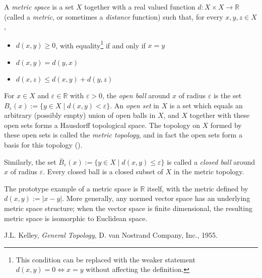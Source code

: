\documentclass{article}
\begin{document}
A \emph{metric space} is a set $X$ together with a real valued function $d: X \times X \longrightarrow \mathbb{R}$ (called a \emph{metric}, or sometimes a \emph{distance} function) such that, for every $x,y,z \in X$,
\begin{itemize}
\item $d(x,y) \geq 0$, with equality\footnote{This condition can be replaced with the weaker statement $d(x,y) = 0 \iff x=y$ without affecting the definition.} if and only if $x=y$
\item $d(x,y) = d(y,x)$
\item $d(x,z) \leq d(x,y) + d(y,z)$
\end{itemize}
For $x \in X$ and $\varepsilon \in \mathbb{R}$ with $\varepsilon > 0$, the \emph{open ball} around $x$ of radius $\varepsilon$ is the set $B_\varepsilon(x) := \{y \in X \mid d(x,y) < \varepsilon\}$. An \emph{open set} in $X$ is a set which equals an arbitrary (possibly empty) union of open balls in $X$, and $X$ together with these open sets forms a Hausdorff topological space. The topology on $X$ formed by these open sets is called the \emph{metric topology}, and in fact the open sets form a basis for this topology ().

Similarly, the set $\bar{B}_\varepsilon(x) := \{y \in X \mid d(x,y) \leq \varepsilon\}$ is called a \emph{closed ball} around $x$ of radius $\varepsilon$. Every closed ball is a closed subset of $X$ in the metric topology.

The prototype example of a metric space is $\mathbb{R}$ itself, with the metric defined by $d(x,y) := |x-y|$. More generally, any normed vector space has an underlying metric space structure; when the vector space is finite dimensional, the resulting metric space is isomorphic to Euclidean space.

\begin{thebibliography}{9}
 J.L. Kelley,
 \emph{General Topology},
 D. van Nostrand Company, Inc., 1955.
 \end{thebibliography}
\end{document}
